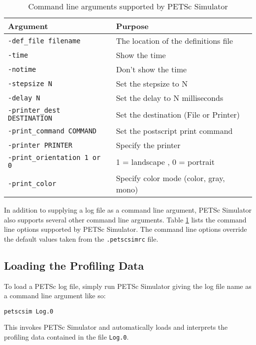\begin{table}
\begin{tabular}{||l||l||} \hline
{\bf Argument}                  & {\bf Purpose} \\ \hline
{\tt -def\_file filename}       & The location of the definitions file \\ \hline
{\tt -time}                    & Show the time \\ \hline
{\tt -notime}                  & Don't show the time \\ \hline
{\tt -stepsize N}              & Set the stepsize to N \\ \hline
{\tt -delay N}                 & Set the delay to N milliseconds \\ \hline 
{\tt -printer\_dest DESTINATION}& Set the destination (File or Printer) \\ \hline
{\tt -print\_command COMMAND}   & Set the postscript print command \\ \hline
{\tt -printer PRINTER}         & Specify the printer \\ \hline
{\tt -print\_orientation 1 or 0}& 1 = landscape , 0 = portrait \\ \hline
{\tt -print\_color}             & Specify color mode (color, gray, mono) \\ \hline
\end{tabular}
\label{PETSc Simulator command line options}
\caption{Command line arguments supported by PETSc Simulator}
\end{table}

In addition to supplying a log file as a command line argument, PETSc Simulator also supports several other command line arguments.  Table \ref{PETSc Simulator command line options} lists the command line options supported by PETSc Simulator.  The command line options override the default values taken from the {\tt .petscsimrc} file.

\subsection{Loading the Profiling Data}

To load a PETSc log file, simply run PETSc Simulator giving the log file name as a command line argument like so:
\begin{verbatim}
petscsim Log.0
\end{verbatim}
This invokes PETSc Simulator and automatically loads and interprets the profiling data contained in the file {\tt Log.0}.

